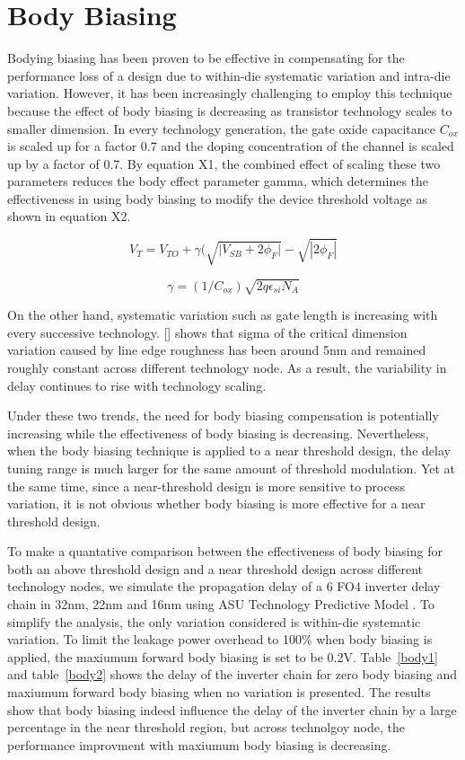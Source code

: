 \section{Body Biasing}
\label{sec:bodybiasing}

Bodying biasing has been proven to be effective in compensating for the
performance loss of a design due to within-die systematic variation and
intra-die variation. However, it has been increasingly challenging to employ
this technique because the effect of body biasing is decreasing as transistor
technology scales to smaller dimension. In every technology generation, the gate
oxide capacitance $C_{ox}$ is scaled up for a factor 0.7 and the doping
concentration of the channel is scaled up by a factor of 0.7. By equation X1,
the combined effect of scaling these two parameters reduces the body effect
parameter gamma, which determines the effectiveness in using body biasing to
modify the device threshold voltage as shown in equation X2.

\begin{equation}
V_{T} = V_{TO} + \gamma ( \sqrt{ | {V_{SB} + 2\phi_{F} | } } - \sqrt{ | 2\phi_{F} | } 
\end{equation}

\begin{equation}
\gamma = (1/C_{ox})\sqrt{2q\epsilon_{si}N_A}
\end{equation}

On the other hand, systematic variation such as gate length is increasing with
every successive technology. [] shows that sigma of the critical dimension
variation caused by line edge roughness has been around 5nm and remained roughly
constant across different technology node. As a result, the variability in delay
continues to rise with technology scaling. 


Under these two trends, the need for body biasing compensation is potentially increasing
while the effectiveness of body biasing is decreasing. Nevertheless, when the
body biasing technique is applied to a near threshold design, the delay tuning
range is much larger for the same amount of threshold modulation. Yet at the
same time, since a near-threshold design is more sensitive to process variation,
it is not obvious whether body biasing is more effective for a near threshold
design. 

To make a quantative comparison between the effectiveness of body biasing for both an
above threshold design and a near threshold design across different technology
nodes,  we simulate the propagation  delay of a 6 FO4 inverter delay chain in
32nm, 22nm and 16nm using ASU Technology Predictive Model \cite{PredictiveModel}. To simplify the
analysis, the only variation considered is within-die systematic variation. To limit the leakage power overhead to 100\% when body biasing is applied, the maxiumum forward body biasing is set to be 0.2V.  Table~\ref{body1} and table~\ref{body2} shows the delay of the inverter chain for zero body biasing and maxiumum forward body biasing when no variation is presented. The results show that body biasing indeed influence the delay of the inverter chain by a large percentage in the near threshold region, but across technolgoy node, the performance improvment with maxiumum body biasing is decreasing.   


